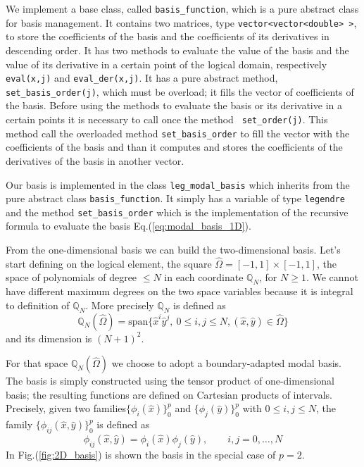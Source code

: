 We implement a base class, called \verb|basis_function|, which is a pure abstract class for basis management. It contains two matrices, type \verb|vector<vector<double> >|, to store the coefficients of the basis and the coefficients of its derivatives in descending order. It has two methods to evaluate the value of the basis and the value of its derivative in a certain point of the logical domain, respectively \verb|eval(x,j)| and \verb|eval_der(x,j)|. It has a pure abstract method, \verb|set_basis_order(j)|, which must be overload; it fills the vector of coefficients of the basis. Before using the methods to evaluate the basis or its derivative in a certain points it is necessary to call once the method \verb| set_order(j)|. This method call the overloaded method \verb|set_basis_order| to fill the vector with the coefficients of the basis and than it computes and stores the coefficients of the derivatives of the basis in another vector.
\medskip

Our basis is implemented in the class \verb|leg_modal_basis| which inherits from the pure abstract class \verb|basis_function|. It simply has a variable of type \verb|legendre| and the method \verb|set_basis_order| which is the implementation of the recursive formula to evaluate the basis Eq.(\ref{eq:modal_basis_1D}).
\medskip

From the one-dimensional basis we can build the two-dimensional basis. Let's start defining on the logical element, the square $\hat{\Omega}=[-1,1]\times[-1,1]$, the space of polynomials of degree $\leq N$ in each coordinate $\mathbb{Q}_N$, for $N\geq 1$. We cannot have different maximum degrees on the two space variables because it is integral to definition of $\mathbb{Q}_N$. More precisely $\mathbb{Q}_N$ is defined as
\begin{equation}
  \mathbb{Q}_N(\hat{\Omega})=\mathrm{span}\{\hat{x}^i \hat{y}^j, \: 0\leq i,j\leq N,(\hat{x},\hat{y})\in \hat{\Omega}\}
\end{equation}
and its dimension is $(N+1)^2$.

For that space $\mathbb{Q}_N(\hat{\Omega})$ we choose to adopt a boundary-adapted modal basis. The basis is simply constructed using the tensor product of one-dimensional basis; the resulting functions are defined on Cartesian products of intervals. Precisely, given two families$\{\phi_i(\hat{x})\}_0^p$ and $\{\phi_j(\hat{y})\}_0^p$ with $0\leq i,j\leq N$, the family $\{\phi_{ij}(\hat{x},\hat{y})\}_0^p$ is defined as
\begin{equation}
  \phi_{ij}(\hat{x},\hat{y})=\phi_i(\hat{x})\phi_j(\hat{y}),\qquad i,j=0,\dots,N
\end{equation}
In Fig.(\ref{fig:2D_basis}) is shown the basis in the special case of $p=2$.

